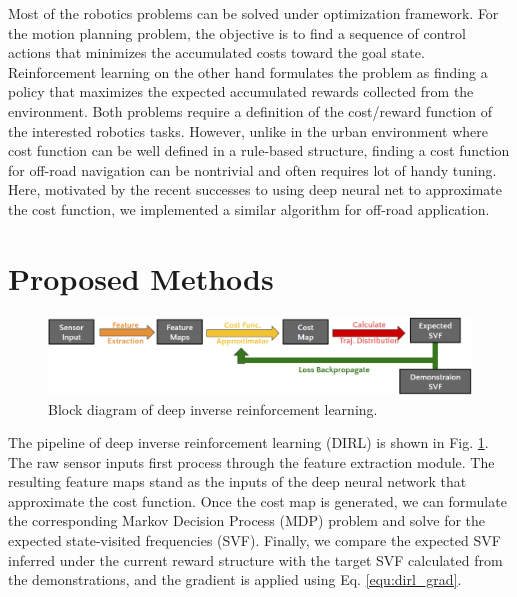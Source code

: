 \documentclass[../thesis.tex]{subfiles}
\begin{document}
 
 
 
Most of the robotics problems can be solved under optimization framework.
For the motion planning problem, the objective is to find a sequence of control actions that minimizes the accumulated costs toward the goal state.
Reinforcement learning on the other hand formulates the problem as finding a policy that maximizes the expected accumulated rewards collected from the environment.
Both problems require a definition of the cost/reward function of the interested robotics tasks.
However, unlike in the urban environment where cost function can be well defined in a rule-based structure, finding a cost function for off-road navigation can be nontrivial and often requires lot of handy tuning. \cite{silver2010learning}
Here, motivated by the recent successes \cite{wulfmeier2015maximum,wulfmeier2016watch} to using deep neural net to approximate the cost function, we implemented a similar algorithm for off-road application.
 
 
\section{Proposed Methods}
 
\begin{figure}[t]
    	\begin{center}
    	 \centerline{\includegraphics[width=\columnwidth]{./DIRL/fig/dirl_diagram.png}}
           	\caption{Block diagram of deep inverse reinforcement learning.}
           	\label{fig:dirl_diagram}
    	\end{center}
\end{figure}
 
The pipeline of deep inverse reinforcement learning (DIRL) is shown in Fig. \ref{fig:dirl_diagram}.
The raw sensor inputs first process through the feature extraction module.
The resulting feature maps stand as the inputs of the deep neural network that approximate the cost function.
Once the cost map is generated, we can formulate the corresponding Markov Decision Process (MDP) problem and solve for the expected state-visited frequencies (SVF).
Finally, we compare the expected SVF inferred under the current reward structure with the target SVF calculated from the demonstrations, and the gradient is applied using Eq. \ref{equ:dirl_grad}.
 
\end{document}
